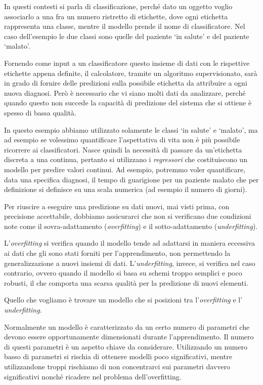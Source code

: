 \documentclass[a4paper,12pt]{report}
\begin{document}
In questi contesti si parla di classificazione, perché dato un oggetto voglio associarlo a una fra un numero ristretto di etichette, dove ogni etichetta rappresenta una classe, mentre il modello prende il nome di classificatore. Nel caso dell'esempio le due classi sono quelle del paziente `in salute' e del paziente `malato'. 

Fornendo come input a un classificatore questo insieme di dati con le rispettive etichette appena definite, il calcolatore, tramite un algoritmo supervisionato, sarà in grado di fornire delle predizioni sulla possibile etichetta da attribuire a ogni nuova diagnosi.
Però è necessario che vi siano molti dati da analizzare, perché quando questo non succede la capacità di predizione del sistema che si ottiene è spesso di bassa qualità.

In questo esempio abbiamo utilizzato solamente le classi `in salute' e `malato', ma ad esempio se volessimo quantificare l'aspettativa di vita non è più possibile ricorrere ai classificatori. Nasce quindi la necessità di passare da un'etichetta discreta a una continua, pertanto si utilizzano i \textit{regressori} che costituiscono un modello per predire valori continui.
Ad esempio, potremmo voler quantificare, data una specifica diagnosi, il tempo di guarigione per un paziente malato che per definizione si definisce su una scala numerica (ad esempio il numero di giorni).

Per riuscire a eseguire una predizione su dati nuovi, mai visti prima, con precisione accettabile, dobbiamo assicurarci che non si verificano due condizioni note come il sovra-adattamento (\textit{overfitting}) e il sotto-adattamento (\textit{underfitting}).


L’\textit{overfitting} si verifica quando il modello tende ad adattarsi in maniera eccessiva ai dati che gli sono stati forniti per l'apprendimento, non permettendo la generalizzazione a nuovi insiemi di dati. L’\textit{underfitting}, invece, si verifica nel caso contrario, ovvero quando il modello si basa su schemi troppo semplici e poco robusti, il che comporta una scarsa qualità per la predizione di nuovi elementi.

Quello che vogliamo è trovare un modello che si posizioni tra l'\textit{overfitting} e l' \textit{underfitting}.

Normalmente un modello è caratterizzato da un certo numero di parametri che devono essere opportunamente dimensionati durante l'apprendimento.
Il numero di questi parametri è un aspetto chiave da considerare.
Utilizzando un numero basso di parametri si rischia di ottenere modelli poco significativi, mentre utilizzandone troppi rischiamo di non concentrarci sui parametri davvero significativi nonché ricadere nel problema dell'overfitting.
\end{document}
